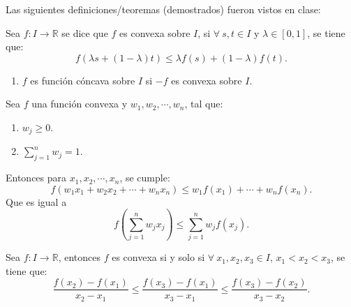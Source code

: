 


Las siguientes definiciones/teoremas (demostrados) fueron vistos en clase: 
\begin{tcolorbox}[colback=blue!15,colframe=blue!1!blue,title=Definición de funciones convexas]
	Sea $f : I \to \mathbb{R}$ se dice que $f$ es convexa sobre $I$, si $\forall \ s,t \in I$ y $\lambda\in [0,1]$, se tiene que: 
	$$f( \lambda s+(1 -\lambda)t) \leq \lambda f(s)+ (1 - \lambda)f(t).$$
	\begin{enumerate}
		\item $f$ es función cóncava sobre $I$ si $-f$ es convexa sobre $I$.
	\end{enumerate}
\end{tcolorbox}

\begin{tcolorbox}[colback=gray!15,colframe=gray!1!gray,title=Teorema (Desigualdad de Jensen)]
	Sea $f$ una función convexa y $w_1,w_2,\cdots, w_n$, tal que: 
	\begin{enumerate}
		\item $w_j\geq 0$.
		\item $\sum_{j=1}^{n}w_j =1$. 
	\end{enumerate}
Entonces para $x_1,x_2,\cdots, x_n$, se cumple: 
$$f\left(w_1x_1+w_2x_2+\cdots + w_nx_n\right)\leq w_1f(x_1)+\cdots +w_nf(x_n).$$
Que es igual a 
$$f\left(\sum_{j=1}^{n}w_jx_j\right)\leq \sum_{j=1}^{n}w_jf(x_j).$$
\end{tcolorbox}

\begin{tcolorbox}[colback=gray!15,colframe=gray!1!gray,title=Lema (De las tres cuerdas)]
	Sea $f:I\to\mathbb{R}$, entonces $f$ es convexa si y solo si $\forall \ x_1,x_2,x_3\in I$, $x_1<x_2<x_3$, se tiene que: 
	$$\frac{f(x_2)-f(x_1)}{x_2-x_1}\leq \frac{f(x_3)-f(x_1)}{x_3-x_1}\leq \frac{f(x_3)-f(x_2)}{x_3-x_2}.$$
\end{tcolorbox}










